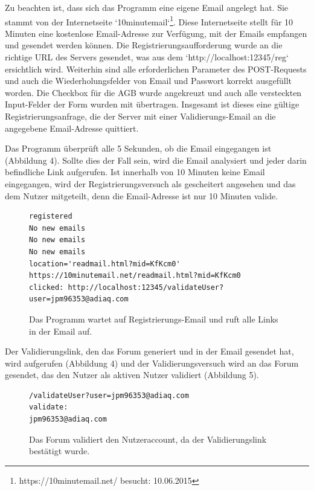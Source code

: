 Zu beachten ist, dass sich das Programm eine eigene Email angelegt hat. Sie stammt von der Internetseite `10minutemail`\footnote{https://10minutemail.net/ besucht: 10.06.2015}.
Diese Internetseite stellt für 10 Minuten eine kostenlose Email-Adresse zur Verfügung, mit der Emails empfangen und gesendet werden können. Die Registrierungsaufforderung wurde an die richtige URL des Servers gesendet, was aus dem `http://localhost:12345/reg` ersichtlich wird. Weiterhin sind alle erforderlichen Parameter des POST-Requests und auch die Wiederholungsfelder von Email und Passwort korrekt ausgefüllt worden. Die Checkbox für die AGB wurde angekreuzt und auch alle versteckten Input-Felder der Form wurden mit übertragen. Insgesamt ist dieses eine gültige Registrierungsanfrage, die der Server mit einer Validierungs-Email an die angegebene Email-Adresse quittiert.

Das Programm überprüft alle 5 Sekunden, ob die Email eingegangen ist (Abbildung 4). Sollte dies der Fall sein, wird die Email analysiert und jeder darin befindliche Link aufgerufen. Ist innerhalb von 10 Minuten keine Email eingegangen, wird der Registrierungsversuch als gescheitert angesehen und das dem Nutzer mitgeteilt, denn die Email-Adresse ist nur 10 Minuten valide.

\begin{figure}[ht]
\begin{lstlisting}[language=HTML5]
registered
No new emails
No new emails
No new emails
location='readmail.html?mid=KfKcm0'
https://10minutemail.net/readmail.html?mid=KfKcm0
clicked: http://localhost:12345/validateUser?user=jpm96353@adiaq.com
\end{lstlisting}
\caption{Das Programm wartet auf Registrierungs-Email und ruft alle Links in der Email auf.}
\end{figure}

Der Validierungslink, den das Forum generiert und in der Email gesendet hat, wird aufgerufen (Abbildung 4) und der Validierungsversuch wird an das Forum gesendet, das den Nutzer als aktiven Nutzer validiert (Abbildung 5).

\begin{figure}[ht]
\begin{lstlisting}[language=HTML5]
/validateUser?user=jpm96353@adiaq.com
validate:
jpm96353@adiaq.com
\end{lstlisting}
\caption{Das Forum validiert den Nutzeraccount, da der Validierungslink bestätigt wurde.}
\end{figure}

